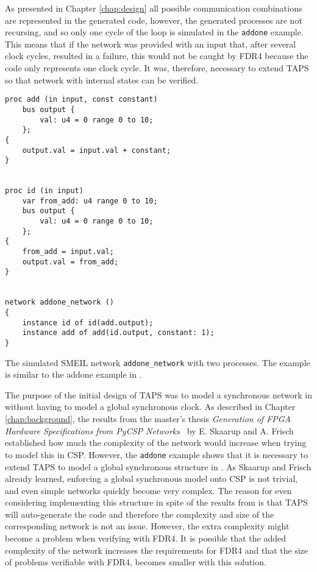 As presented in Chapter \ref{chap:design} all possible communication combinations are represented in the generated \cspm{} code, however, the generated \cspm{} processes are not recursing, and so only one cycle of the loop is simulated in the \texttt{addone} example. This means that if the network was provided with an input that, after several clock cycles, resulted in a failure, this would not be caught by FDR4 because the \cspm{} code only represents one clock cycle. It was, therefore, necessary to extend TAPS so that network with internal states can be verified.\\
\begin{listing}
\begin{verbatim}
proc add (in input, const constant)
    bus output {
        val: u4 = 0 range 0 to 10;
    };
{
    output.val = input.val + constant;
}


proc id (in input)
    var from_add: u4 range 0 to 10;
    bus output {
        val: u4 = 0 range 0 to 10;
    };
{
    from_add = input.val;
    output.val = from_add;
}


network addone_network ()
{
    instance id of id(add.output);
    instance add of add(id.output, constant: 1);
}
\end{verbatim}
\caption{The simulated SMEIL network \texttt{addone\_network} with two processes. The example is similar to the addone example in \cite{smeil}.}
\label{lst:addone_smeil_example}
\end{listing}

The purpose of the initial design of TAPS was to model a synchronous network in \cspm{} without having to model a global synchronous clock. As described in Chapter \ref{chap:background}, the results from the master's thesis \textit{Generation of FPGA Hardware
Specifications from PyCSP Networks}~\cite{Skaarup14} by E. Skaarup and A. Frisch established how much the complexity of the network would increase when trying to model this in CSP.
However, the \texttt{addone} example shows that it is necessary to extend TAPS to model a global synchronous structure in \cspm{}. As Skaarup and Frisch already learned, enforcing a global synchronous model onto CSP is not trivial, and even simple networks quickly become very complex. The reason for even considering implementing this structure in spite of the results from \cite{Skaarup14} is that TAPS will auto-generate the \cspm{} code and therefore the complexity and size of the corresponding \cspm{} network is not an issue. However, the extra complexity might become a problem when verifying with FDR4. It is possible that the added complexity of the network increases the requirements for FDR4 and that the size of problems verifiable with FDR4, becomes smaller with this solution. \\


